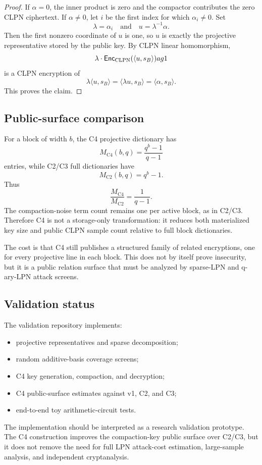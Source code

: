 \begin{proof}
If \(\alpha=0\), the inner product is zero and the compactor contributes the zero CLPN ciphertext.  If \(\alpha\ne 0\), let \(i\) be the first index for which \(\alpha_i\ne 0\).  Set
\[
  \lambda = \alpha_i
  \quad\text{and}\quad
  u = \lambda^{-1}\alpha.
\]
Then the first nonzero coordinate of \(u\) is one, so \(u\) is exactly the projective representative stored by the public key.  By CLPN linear homomorphism,
\[
  \lambda\cdot \mathsf{Enc}_{\mathrm{CLPN}}(\langle u,s_B\rangle)
	ag{1}
\]
is a CLPN encryption of
\[
  \lambda\langle u,s_B\rangle
  = \langle \lambda u,s_B\rangle
  = \langle \alpha,s_B\rangle.
\]
This proves the claim.
\end{proof}

\subsection{Public-surface comparison}

For a block of width \(b\), the C4 projective dictionary has
\[
  M_{\mathrm{C4}}(b,q)=\frac{q^b-1}{q-1}
\]
entries, while C2/C3 full dictionaries have
\[
  M_{\mathrm{C2}}(b,q)=q^b-1.
\]
Thus
\[
  \frac{M_{\mathrm{C4}}}{M_{\mathrm{C2}}}=\frac{1}{q-1}.
\]
The compaction-noise term count remains one per active block, as in C2/C3.  Therefore C4 is not a storage-only transformation: it reduces both materialized key size and public CLPN sample count relative to full block dictionaries.

The cost is that C4 still publishes a structured family of related encryptions, one for every projective line in each block.  This does not by itself prove insecurity, but it is a public relation surface that must be analyzed by sparse-LPN and q-ary-LPN attack screens.

\subsection{Validation status}

The validation repository implements:
\begin{itemize}
  \item projective representatives and sparse decomposition;
  \item random additive-basis coverage screens;
  \item C4 key generation, compaction, and decryption;
  \item C4 public-surface estimates against v1, C2, and C3;
  \item end-to-end toy arithmetic-circuit tests.
\end{itemize}

The implementation should be interpreted as a research validation prototype.  The C4 construction improves the compaction-key public surface over C2/C3, but it does not remove the need for full LPN attack-cost estimation, large-sample analysis, and independent cryptanalysis.
